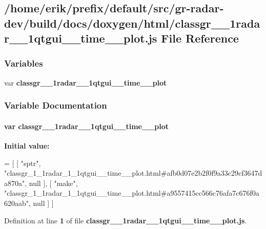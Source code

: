 \subsection{/home/erik/prefix/default/src/gr-\/radar-\/dev/build/docs/doxygen/html/classgr\+\_\+\_\+1radar\+\_\+\_\+1qtgui\+\_\+\+\_\+time\+\_\+\+\_\+plot.js File Reference}
\label{classgr__1__1radar__1__1qtgui____time____plot_8js}
\subsubsection*{Variables}
\begin{DoxyCompactItemize}
\item 
var {\bf classgr\+\_\+\_\+1radar\+\_\+\_\+1qtgui\+\_\+\+\_\+time\+\_\+\+\_\+plot}
\end{DoxyCompactItemize}


\subsubsection{Variable Documentation}
\paragraph[{classgr\+\_\+1\+\_\+1radar\+\_\+1\+\_\+1qtgui\+\_\+\+\_\+time\+\_\+\+\_\+plot}]{\setlength{\rightskip}{0pt plus 5cm}var classgr\+\_\+\_\+1radar\+\_\+\_\+1qtgui\+\_\+\+\_\+time\+\_\+\+\_\+plot}\label{classgr__1__1radar__1__1qtgui____time____plot_8js_a0877f95dfa895661f64b1018e9219942}
{\bfseries Initial value\+:}
\begin{DoxyCode}
=
[
    [ \textcolor{stringliteral}{"sptr"}, \textcolor{stringliteral}{"classgr\_1\_1radar\_1\_1qtgui\_\_time\_\_plot.html#afb0d07e2b2f0f9a33c29cf3647da870a"}, null ],
    [ \textcolor{stringliteral}{"make"}, \textcolor{stringliteral}{"classgr\_1\_1radar\_1\_1qtgui\_\_time\_\_plot.html#a9557415cc566c76afa7c676f0a620aab"}, null ]
]
\end{DoxyCode}


Definition at line {\bf 1} of file {\bf classgr\+\_\+\_\+1radar\+\_\+\_\+1qtgui\+\_\+\+\_\+time\+\_\+\+\_\+plot.\+js}.

